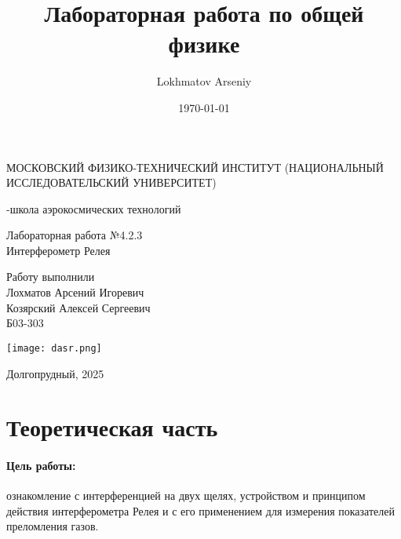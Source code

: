 \documentclass[a4paper,12pt]{article} %
\author{Lokhmatov Arseniy}
\title{Лабораторная работа по общей физике}
\date{\today}
\begin{document}
\begin{titlepage}
    \newpage
    \begin{center}
    {\large МОСКОВСКИЙ ФИЗИКО-ТЕХНИЧЕСКИЙ ИНСТИТУТ (НАЦИОНАЛЬНЫЙ ИССЛЕДОВАТЕЛЬСКИЙ УНИВЕРСИТЕТ)}
    \vspace{1cm}

    {-школа аэрокосмических технологий}
    \vspace{6em}
    \end{center}
    
    \vspace{1.2em}

    \begin{center}
    \Large Лабораторная работа №4.2.3 \\
    Интерферометр Релея
    \linebreak
    \end{center}
    
    \vspace{11em}
    
    \begin{flushright}
                       {\large Работу выполнили\\
                       Лохматов Арсений Игоревич\\
                       Козярский Алексей Сергеевич\\
                       Б03-303 }
    \end{flushright}

    \vspace{\fill}

    \begin{center}
        \texttt{[image: dasr.png]}
    \end{center}

    \begin{center}
    Долгопрудный, 2025
    \end{center}

    \end{titlepage}

\section{Теоретическая часть}

\paragraph{Цель работы:}ознакомление с интерференцией на двух щелях, устройством и принципом действия интерферометра Релея и с его применением для измерения показателей преломления газов.
\end{document}
